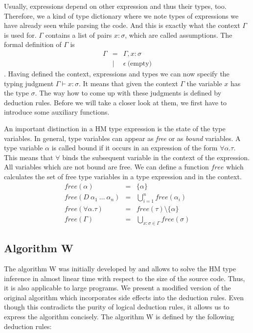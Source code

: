 Usually, expressions depend on other expression and thus their types, too.
Therefore, we a kind of type dictionary where we note types of expressions we have already seen while parsing the code.
And this is exactly what the context $\Gamma$ is used for.
$\Gamma$ contains a list of pairs $x:\sigma$, which are called assumptions.
The formal definition of $\Gamma$ is
\begin{eqnarray*}
\Gamma &=& \Gamma, x:\sigma \\
&|& \epsilon\ \text{(empty)}
\end{eqnarray*}
.
Having defined the context, expressions and types we can now specify the typing judgment $\Gamma \vdash x : \sigma$.
It means that given the context $\Gamma$ the variable $x$ has the type $\sigma$.
The way how to come up with these judgments is defined by deduction rules.
Before we will take a closer look at them, we first have to introduce some auxiliary functions.

An important distinction in a HM type expression is the state of the type variables.
In general, type variables can appear as \emph{free} or as \emph{bound} variables.
A type variable $\alpha$ is called bound if it occurs in an expression of the form $\forall \alpha. \tau$.
This means that $\forall$ binds the subsequent variable in the context of the expression.
All variables which are not bound are free.
We can define a function $free$ which calculates the set of free type variables in a type expression and in the context.
\begin{eqnarray*}
free(\alpha) &=& \{\alpha\}\\
free(D\ \alpha_1\ \ldots\ \alpha_n) &=& \bigcup_{i=1}^n free(\alpha_i)\\
free(\forall \alpha. \tau) &=& free(\tau) \setminus \{\alpha\}\\
free(\Gamma) &=& \bigcup_{x:\sigma \in \Gamma} free(\sigma)
\end{eqnarray*}

\subsection{Algorithm W}

The algorithm W was initially developed by \textcite{damas:1982a} and allows to solve the HM type inference in almost linear time with respect to the size of the source code.
Thus, it is also applicable to large programs.
We present a modified version of the original algorithm which incorporates side effects into the deduction rules.
Even though this contradicts the purity of logical deduction rules, it allows us to express the algorithm concisely.
The algorithm W is defined by the following deduction rules:

